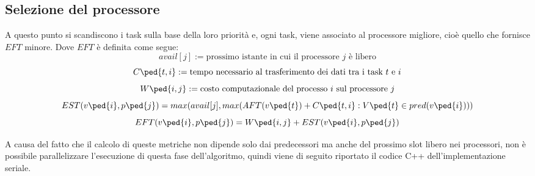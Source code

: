 \subsection{Selezione del processore}
A questo punto si scandiscono i task sulla base della loro priorità e, ogni task, viene associato al processore migliore, cioè quello che fornisce $EFT$ minore. 
Dove $EFT$ è definita come segue:
\begin{displaymath}
	avail[j] := \text{prossimo istante in cui il processore $j$ è libero}
\end{displaymath}
\begin{displaymath}
	C\ped{t,i} := \text{tempo necessario al trasferimento dei dati tra i task $t$ e $i$} 
\end{displaymath}
\begin{displaymath}
	W\ped{i,j} := \text{costo computazionale del processo $i$ sul processore $j$} 
\end{displaymath}
\begin{equation}\label{EST}
	EST(v\ped{i},p\ped{j}) = max(avail[j], max(AFT(v\ped{t}) + C\ped{t,i} : V\ped{t} \in pred(v\ped{i})))
\end{equation}
\begin{equation}\label{EFT}
	EFT(v\ped{i},p\ped{j}) = W\ped{i,j} + EST(v\ped{i},p\ped{j})
\end{equation}

A causa del fatto che il calcolo di queste metriche non dipende solo dai predecessori ma anche del prossimo slot libero nei processori, non è possibile parallelizzare l'esecuzione di questa fase dell'algoritmo, quindi viene di seguito riportato il codice C++ dell'implementazione seriale.


